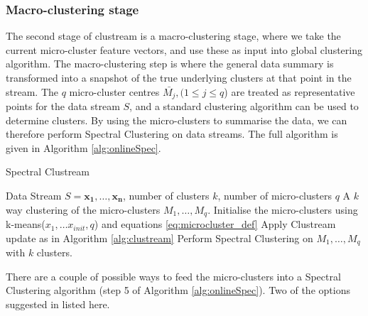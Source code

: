 \subsubsection{Macro-clustering stage}
 
The second stage of clustream is a macro-clustering stage, where we take the current micro-cluster feature vectors, and use these as input into global clustering algorithm. The macro-clustering step is where the general data summary is transformed into a snapshot of the true underlying clusters at that point in the stream. The $q$ micro-cluster centres $\bar{M_j},(1 \leq j \leq q$) are treated as representative points for the data stream $S$, and a standard clustering algorithm can be used to determine clusters. By using the micro-clusters to summarise the data, we can therefore perform Spectral Clustering on data streams.  The full algorithm is given in Algorithm \ref{alg:onlineSpec}. %


\begin{algorithm}
\caption{Spectral Clustream}
\begin{algorithmic}[1]
\REQUIRE Data Stream $S = {\boldsymbol{x_1},\ldots, \boldsymbol{x_n}  }$, number of clusters $k$, number of micro-clusters $q$
\ENSURE A $k$ way clustering of the micro-clusters $M_1, \ldots, M_q$.
\STATE Initialise the micro-clusters using k-means($x_1, \hdots x_{init},q$) and equations \eqref{eq:microcluster_def}
 \STATE Apply Clustream update as in Algorithm \ref{alg:clustream}
   \STATE Perform Spectral Clustering on $M_1, \ldots, M_q$ with $k$ clusters.
\ENDIF
\ENDFOR

\end{algorithmic}
\label{alg:onlineSpec}
\end{algorithm}

There are a couple of possible ways to feed the micro-clusters into a Spectral Clustering algorithm (step 5 of Algorithm \ref{alg:onlineSpec}). Two of the options suggested in \cite{Zhang1996a} listed here. 

